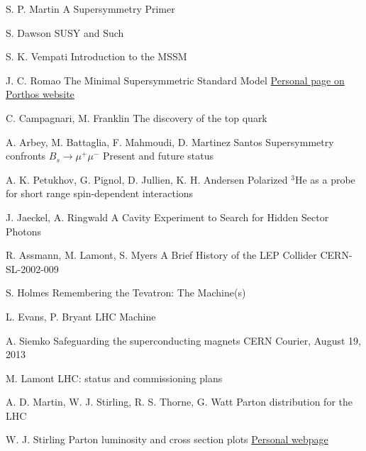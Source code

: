 {S. P. Martin}
{A Supersymmetry Primer}
{}

{S. Dawson}
{SUSY and Such}
{}

{S. K. Vempati}
{Introduction to the MSSM}
{}

{J. C. Romao}
{The Minimal Supersymmetric Standard Model}
{\href{http://porthos.ist.utl.pt/~romao/homepage/publications/}{Personal page on Porthos website}}


{C. Campagnari, M. Franklin}
{The discovery of the top quark}
{}

{A. Arbey, M. Battaglia, F. Mahmoudi, D. Martinez Santos}
{Supersymmetry confronts $B_s \rightarrow \mu^+ \mu^-$ Present and future status}
{}

{A. K. Petukhov, G. Pignol, D. Jullien, K. H. Andersen}
{Polarized $^3$He as a probe for short range spin-dependent interactions}
{}

{J. Jaeckel, A. Ringwald}
{A Cavity Experiment to Search for Hidden Sector Photons}
{}

{R. Assmann, M. Lamont, S. Myers}
{A Brief History of the LEP Collider}
{CERN-SL-2002-009}

{S. Holmes}
{Remembering the Tevatron: The Machine(s)}
{}

{L. Evans, P. Bryant}
{LHC Machine}
{}

{A. Siemko}
{Safeguarding the superconducting magnets}
{CERN Courier, August 19, 2013}

{M. Lamont}
{LHC: status and commissioning plans}
{}

{A. D. Martin, W. J. Stirling, R. S. Thorne, G. Watt}
{Parton distribution for the LHC}
{}

{W. J. Stirling}
{Parton luminosity and cross section plots}
{\href{http://www.hep.ph.ic.ac.uk/~wstirlin/plots/plots.html}{Personal webpage}}

